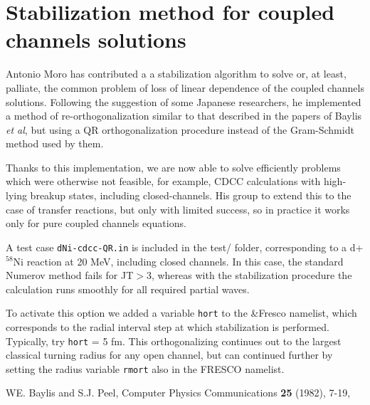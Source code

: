 \documentclass[11pt]{article}
\begin{document}
%

\newpage
\section{Stabilization method for coupled channels solutions}
\label{hort}

Antonio Moro has contributed a 
a stabilization algorithm to solve or, at least, palliate, the common problem of loss of linear dependence of the coupled channels solutions. Following the suggestion of some Japanese researchers, he implemented a method of re-orthogonalization similar to that described in the papers of Baylis {\em et al}, but using a QR orthogonalization procedure instead of the Gram-Schmidt method used by them.

Thanks to this implementation, we are now able to solve efficiently problems which were otherwise not feasible, for example, CDCC calculations with high-lying breakup states, including closed-channels. His group to extend this to the case of transfer reactions, but only with limited success, so in practice it works only for pure coupled channels equations.

A test case {\tt dNi-cdcc-QR.in} is included in the test/ folder, corresponding to a d+$^{58}$Ni reaction at 20 MeV, including closed channels. In this case, the standard Numerov method fails for JT$>$3, whereas with the stabilization procedure the calculation runs smoothly for all required partial waves. 

To activate this option we added a variable {\tt hort} to the \&Fresco namelist, which corresponds to the radial interval step at which stabilization is performed. Typically, try {\tt hort} = 5 fm. 
This orthogonalizing continues out to the largest classical turning radius for any open channel, but can continued further by setting the radius variable {\tt rmort} also in the FRESCO namelist.

WE. Baylis and S.J. Peel, Computer Physics Communications {\bf 25} (1982), 7-19, 
\end{document}
